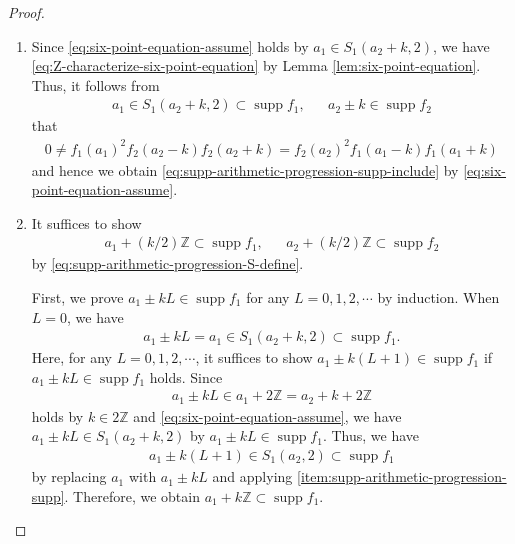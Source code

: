 \documentclass[12pt]{article}
\theoremstyle{definition}
\theoremstyle{remark}
\numberwithin{equation}{section}
\numberwithin{figure}{section}
\numberwithin{table}{section}
\DeclareMathOperator{\supp}{supp}
\begin{document}
\begin{proof}

\begin{enumerate}
    \item 
    Since \eqref{eq:six-point-equation-assume} holds by $ a_1 \in S_1 ( a_2 + k , 2 ) $, we have \eqref{eq:Z-characterize-six-point-equation} by Lemma \ref{lem:six-point-equation}.
    Thus, it follows from
    \begin{align}
        a_1 \in S_1 ( a_2 + k , 2 ) \subset \supp f_1 , & & a_2 \pm k \in \supp f_2
    \end{align}
    that
    \begin{align}
        0
        \neq f_1 ( a_1 )^2 f_2 ( a_2 - k ) f_2 ( a_2 + k )
        = f_2 ( a_2 )^2 f_1 ( a_1 - k ) f_1 ( a_1 + k )
    \end{align}
    and hence we obtain \eqref{eq:supp-arithmetic-progression-supp-include} by \eqref{eq:six-point-equation-assume}.

    \item
It suffices to show
\begin{align}
    a_1 + ( k / 2 ) \mathbb{ Z } \subset \supp f_1, & &
    a_2 + ( k / 2 ) \mathbb{ Z } \subset \supp f_2
\end{align}
by \eqref{eq:supp-arithmetic-progression-S-define}.

First, we prove $ a_1 \pm k L \in \supp f_1 $ for any $ L = 0 , 1 , 2 , \cdots $ by induction.
When $ L = 0 $, we have
\begin{align}
     a_1 \pm k L = a_1 \in S_1 ( a_2 + k , 2 ) \subset \supp f_1.
\end{align}
Here, for any $ L = 0 , 1 , 2 , \cdots $, it suffices to show $ a_1 \pm k ( L + 1 ) \in \supp f_1 $ if $ a_1 \pm k L \in \supp f_1 $ holds.
Since
\begin{align}
    a_1 \pm k L \in a_1 + 2 \mathbb{ Z } = a_2 + k + 2 \mathbb{ Z }
\end{align}
holds by $ k \in 2 \mathbb{ Z } $ and \eqref{eq:six-point-equation-assume}, we have $ a_1 \pm k L \in S_1 ( a_2 + k , 2 ) $ by $ a_1 \pm k L \in \supp f_1 $.
Thus, we have
\begin{align}
    a_1 \pm k ( L + 1 ) \in S_1 ( a_2 , 2 ) \subset \supp f_1
\end{align}
by replacing $ a_1 $ with $ a_1 \pm k L $ and applying \ref{item:supp-arithmetic-progression-supp}.
Therefore, we obtain $ a_1 + k \mathbb{ Z } \subset \supp f_1 $.


\end{enumerate}
\end{proof}
\end{document}
